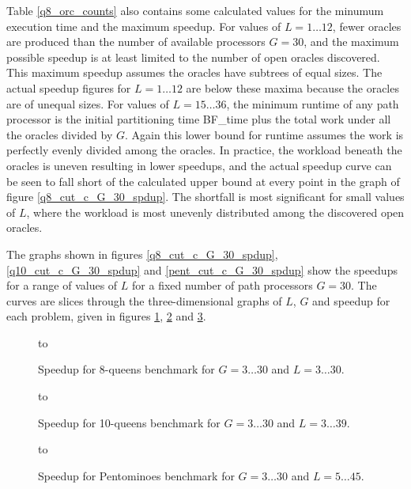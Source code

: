 Table \ref{q8_orc_counts} also contains some calculated values for the minumum execution
time and the maximum speedup.  For values of $L=1\ldots 12$, fewer oracles are produced
than the number of available processors $G=30$, and the maximum possible speedup is
at least limited to the number of open oracles discovered.  This maximum speedup assumes
the oracles have subtrees of equal sizes.  The actual speedup figures for $L=1\ldots 12$
are below these maxima because the oracles are of unequal sizes.  For values of 
$L=15\ldots 36$, the minimum runtime of any path processor is the initial partitioning
time BF\_{}time plus the total work under all the oracles divided by $G$.  Again this
lower bound for runtime assumes the work is perfectly evenly divided among the oracles.
In practice, the workload beneath the oracles is uneven resulting in lower speedups, and
the actual speedup curve can be seen to fall short of the calculated upper bound at every
point in the graph of figure \ref{q8_cut_c_G_30_spdup}.  The shortfall is most
significant for small values of $L$, where the workload is most unevenly distributed
among the discovered open oracles.

The graphs shown in figures \ref{q8_cut_c_G_30_spdup}, \ref{q10_cut_c_G_30_spdup} and 
\ref{pent_cut_c_G_30_spdup} show the speedups for a range of values of $L$ for a fixed
number of path processors $G=30$.  The curves are slices through the three-dimensional
graphs of $L$, $G$ and speedup for each problem, given in figures
\ref{q8_3d}, \ref{q10_3d} and \ref{pent_3d}.

\begin{figure}[p]
\vspace{5mm} \hbox to 
\caption{Speedup for 8-queens benchmark for $G=3\ldots 30$ and $L=3\ldots 30$.}
\vspace{5mm}
\label{q8_3d}
\end{figure}

\begin{figure}[p]
\vspace{5mm} \hbox to 
\caption{Speedup for 10-queens benchmark for $G=3\ldots 30$ and $L=3\ldots 39$.}
\vspace{5mm}
\label{q10_3d}
\end{figure}

\begin{figure}[p]
\vspace{5mm} \hbox to 
\caption{Speedup for Pentominoes benchmark for $G=3\ldots 30$ and $L=5\ldots 45$.}
\vspace{5mm}
\label{pent_3d}
\end{figure}

